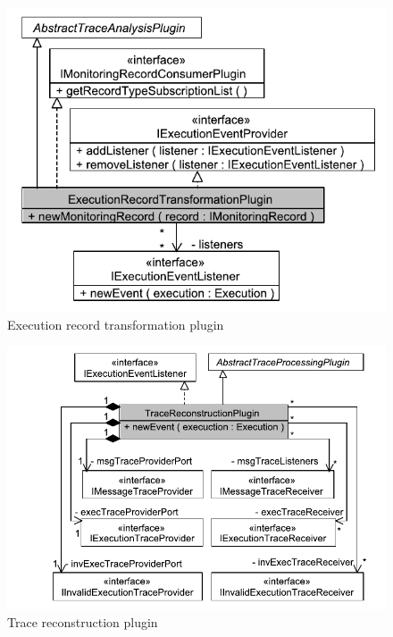 \begin{figure}\centering
\includegraphics[scale=0.65]{figures/model/kieker_executionRecordTransformer}
\caption{Execution record transformation plugin}
\label{fig:execRecordTransformationPlugin}
\end{figure}

\begin{figure}\centering
\includegraphics[scale=0.65]{figures/model/kieker_traceReconstructionFilter}
\caption{Trace reconstruction plugin}
\label{fig:traceReconstructionPlugin}
\end{figure}

